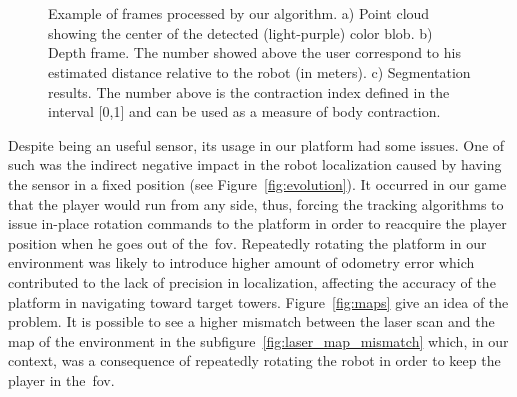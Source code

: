 \begin{figure}[h]
  \centering 
  \begin{subfigure}[b]{0.3\textwidth}
		\centering
		\caption{}
  \end{subfigure}
  ~
  \begin{subfigure}[b]{0.3\textwidth}
		\centering
		\caption{}
  \end{subfigure}
  ~
  \begin{subfigure}[b]{0.3\textwidth}
		\centering
		\caption{}
  \end{subfigure}
  \caption{Example of frames processed by our algorithm. a) Point cloud showing the center of the detected (light-purple) color blob. b) Depth frame. The number showed above the user correspond to his estimated distance relative to the robot (in meters). c) Segmentation results. The number above is the contraction index defined in the interval [0,1] and can be used as a measure of body contraction.}\label{fig:segmenta}
   \label{segmentacao}
\end{figure}

Despite being an useful sensor, its usage in our platform had some issues. One of such was the indirect negative impact in the robot localization caused by having the sensor in a fixed position (see Figure~\ref{fig:evolution}). It occurred in our game that the player would run from any side, thus, forcing the tracking algorithms to issue in-place rotation commands to the platform in order to reacquire the player position when he goes out of the~\gls{fov}. Repeatedly rotating the platform in our environment was likely to introduce higher amount of odometry error which contributed to the lack of precision in localization, affecting the accuracy of the platform in navigating toward target towers. Figure~\ref{fig:maps} give an idea of the problem. It is possible to see a higher mismatch between the laser scan and the map of the environment in the subfigure~\ref{fig:laser_map_mismatch} which, in our context, was a consequence of repeatedly rotating the robot in order to keep the player in the~\gls{fov}. 

